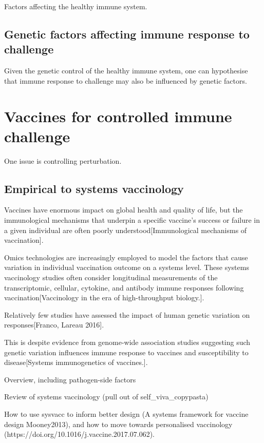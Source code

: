 Factors affecting the healthy immune system.

\subsection{Genetic factors affecting immune response to challenge}

Given the genetic control of the healthy immune system, one can hypothesise that immune response to challenge may also be influenced by genetic factors.

\section{Vaccines for controlled immune challenge}

One issue is controlling perturbation.

\subsection{Empirical to systems vaccinology}

Vaccines have enormous impact on global health and quality of life, but the immunological mechanisms that underpin a specific vaccine’s success or failure in a given individual are often poorly understood[Immunological mechanisms of vaccination]. 

Omics technologies are increasingly employed to model the factors that cause variation in individual vaccination outcome on a systems level. 
These systems vaccinology studies often consider longitudinal measurements of the transcriptomic, cellular, cytokine, and antibody immune responses following vaccination[Vaccinology in the era of high-throughput biology.].

Relatively few studies have assessed the impact of human genetic variation on responses[Franco, Lareau 2016].

This is despite evidence from genome-wide association studies suggesting such genetic variation influences immune response to vaccines and susceptibility to disease[Systems immunogenetics of vaccines.].

Overview, including pathogen-side factors

Review of systems vaccinology (pull out of self\_viva\_copypasta)

    How to use sysvacc to inform better design (A systems framework for vaccine design Mooney2013), and how to move towards personalised vaccinology (https://doi.org/10.1016/j.vaccine.2017.07.062).


